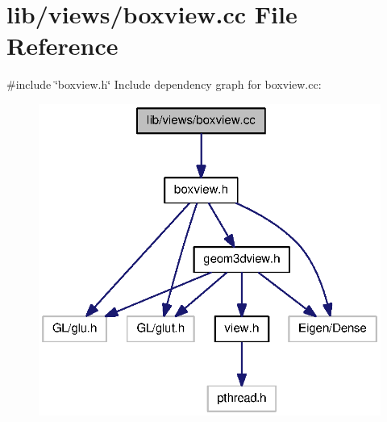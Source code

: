 \section{lib/views/boxview.cc \-File \-Reference}
\label{boxview_8cc}
{\ttfamily \#include \char`\"{}boxview.\-h\char`\"{}}\*
\-Include dependency graph for boxview.\-cc\-:
\nopagebreak
\begin{figure}[H]
\begin{center}
\leavevmode
\includegraphics[width=322pt]{boxview_8cc__incl}
\end{center}
\end{figure}
